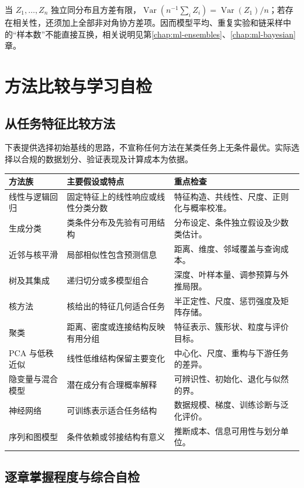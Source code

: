 \documentclass[UTF8,12pt,a4paper,fontset=fandol]{ctexbook}
\begin{document}
当 $Z_1,\ldots,Z_n$ 独立同分布且方差有限，$\operatorname{Var}(n^{-1}\sum_iZ_i)=\operatorname{Var}(Z_1)/n$；若存在相关性，还须加上全部非对角协方差项。因而模型平均、重复实验和链采样中的“样本数”不能直接互换，相关说明见第\ref{chap:ml-ensembles}、\ref{chap:ml-bayesian}章。

\chapter{方法比较与学习自检}
\label{app:ml-methods}

\section{从任务特征比较方法}

下表提供选择初始基线的思路，不宣称任何方法在某类任务上无条件最优。实际选择以合规的数据划分、验证表现及计算成本为依据。
\begin{longtable}{@{}L{3.0cm}L{5.0cm}L{5.7cm}@{}}
  \toprule
  方法族 & 主要假设或特点 & 重点检查 \\
  \midrule
  \endhead
  线性与逻辑回归 & 固定特征上的线性响应或线性分类分数 & 特征构造、共线性、尺度、正则化与概率校准。\\
  生成分类 & 类条件分布及先验有可用结构 & 分布设定、条件独立假设及少数类估计。\\
  近邻与核平滑 & 局部相似性包含预测信息 & 距离、维度、邻域覆盖与查询成本。\\
  树及其集成 & 递归切分或多模型组合 & 深度、叶样本量、调参预算与外推局限。\\
  核方法 & 核给出的特征几何适合任务 & 半正定性、尺度、惩罚强度及矩阵存储。\\
  聚类 & 距离、密度或连接结构反映有用分组 & 特征表示、簇形状、粒度与评价目标。\\
  PCA 与低秩近似 & 线性低维结构保留主要变化 & 中心化、尺度、重构与下游任务的差异。\\
  隐变量与混合模型 & 潜在成分有合理概率解释 & 可辨识性、初始化、退化与似然的界。\\
  神经网络 & 可训练表示适合任务结构 & 数据规模、梯度、训练诊断与泛化评价。\\
  序列和图模型 & 条件依赖或邻接结构有意义 & 推断成本、信息可用性与划分单位。\\
  \bottomrule
\end{longtable}

\section{逐章掌握程度与综合自检}
\end{document}
